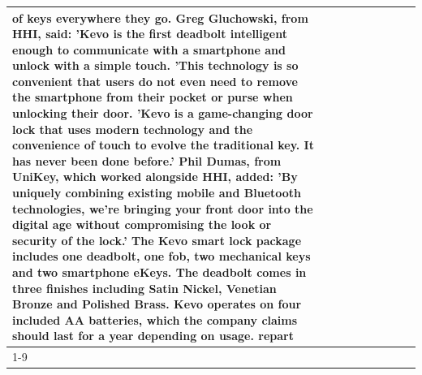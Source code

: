 \begin{table}[H]
\begin{tabular}{lllrlllll}
of keys everywhere they go. Greg Gluchowski, from HHI, said: 'Kevo is the first deadbolt intelligent enough to communicate with a smartphone and unlock with a simple touch. 'This technology is so convenient that users do not even need to remove the smartphone from their pocket or purse when unlocking their door. 'Kevo is a game-changing door lock that uses modern technology and the convenience of touch to evolve the traditional key. It has never been done before.' Phil Dumas, from UniKey, which worked alongside HHI, added: 'By uniquely combining existing mobile and Bluetooth technologies, we’re bringing your front door into the digital age without compromising the look or security of the lock.' The Kevo smart lock package includes one deadbolt, one fob, two mechanical keys and two smartphone eKeys. The deadbolt comes in three finishes including Satin Nickel, Venetian Bronze and Polished Brass. Kevo operates on four included AA batteries, which the company claims should last for a year depending on usage. repart \\
\cline{1-9}

\end{tabular}
\end{table}
